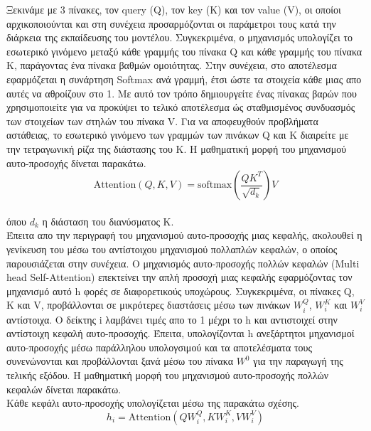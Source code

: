 \documentclass[12pt]{article}
\numberwithin{equation}{section}
\begin{document}
Ξεκινάμε με 3 πίνακες, τον query (Q), τον key (K) και τον value (V), οι οποίοι αρχικοποιούνται και στη συνέχεια προσαρμόζονται οι παράμετροι τους κατά την διάρκεια της εκπαίδευσης του μοντέλου. Συγκεκριμένα, ο μηχανισμός υπολογίζει το εσωτερικό γινόμενο μεταξύ κάθε γραμμής του πίνακα Q και κάθε γραμμής του πίνακα Κ, παράγοντας ένα πίνακα βαθμών ομοιότητας. Στην συνέχεια, στο αποτέλεσμα εφαρμόζεται η συνάρτηση Softmax ανά γραμμή, έτσι ώστε τα στοιχεία κάθε μιας απο αυτές να αθροίζουν στο 1. Με αυτό τον τρόπο δημιουργείτε ένας πίνακας βαρών που χρησιμοποιείτε για να προκύψει το τελικό αποτέλεσμα ώς σταθμισμένος συνδυασμός των στοιχείων των στηλών του πίνακα V. Για να αποφευχθούν προβλήματα αστάθειας, το εσωτερικό γινόμενο των γραμμών των πινάκων Q και K διαιρείτε με την τετραγωνική ρίζα της διάστασης του K. Η μαθηματική μορφή του μηχανισμού αυτο-προσοχής δίνεται παρακάτω. \\

\begin{equation}
\text{Attention}(Q, K, V) = \text{softmax}\left( \frac{QK^T}{\sqrt{d_k}} \right) V
\end{equation}\\

\noindent όπου \(d_k\) η διάσταση του διανύσματος K.\\

Έπειτα απο την περιγραφή του μηχανισμού αυτο-προσοχής μιας κεφαλής, ακολουθεί η γενίκευση του μέσω του αντίστοιχου μηχανισμού πολλαπλών κεφαλών, ο οποίος παρουσιάζεται στην συνέχεια. Ο μηχανισμός αυτο-προσοχής πολλών κεφαλών (Multi head Self-Attention) επεκτείνει την απλή προσοχή μιας κεφαλής εφαρμόζοντας τον μηχανισμό αυτό h φορές σε διαφορετικούς υποχώρους. Συγκεκριμένα, οι πίνακες Q, K και V, προβάλλονται σε μικρότερες διαστάσεις μέσω των πινάκων \(W_i^Q\), \(W_i^K\) και \(W_i^V\) αντίστοιχα. Ο δείκτης i λαμβάνει τιμές απο το 1 μέχρι το h και αντιστοιχεί στην αντίστοιχη κεφαλή αυτο-προσοχής. Έπειτα, υπολογίζονται h ανεξάρτητοι μηχανισμοί αυτο-προσοχής μέσω παράλληλου υπολογσιμού και τα αποτελέσματα τους συνενώνονται και προβάλλονται ξανά μέσω του πίνακα \(W^0\) για την παραγωγή της τελικής εξόδου. Η μαθηματική μορφή του μηχανισμού αυτο-προσοχής πολλών κεφαλών δίνεται παρακάτω.\\

\noindent Κάθε κεφάλι αυτο-προσοχής υπολογίζεται μέσω της παρακάτω σχέσης.\\


\begin{equation}
h_i = \text{Attention}(QW_i^Q, KW_i^K, VW_i^V)
\end{equation}\\
\end{document}
